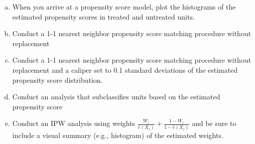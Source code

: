 \begin{enumerate}[(a)]
\item
  \begin{quoting}
    When you arrive at a propensity score model, plot the histograms
    of the estimated propensity scores in treated and untreated units.
  \end{quoting}

\item
  \begin{quoting}
    Conduct a 1-1 nearest neighbor propensity score matching procedure
    without replacement
  \end{quoting}

\item
  \begin{quoting}
    Conduct a 1-1 nearest neighbor propensity score matching procedure
    without replacement and a caliper set to 0.1 standard deviations
    of the estimated propensity score distribution.
  \end{quoting}

\item
  \begin{quoting}
    Conduct an analysis that subclassifies units based on the
    estimated propensity score
  \end{quoting}

\item
  \begin{quoting}
    Conduct an IPW analysis using weights
    $\frac{W_i}{\hat e(X_i)} + \frac{1 - W_i}{1 - \hat e(X_i)}$ and be
    sure to include a visual summary (e.g., histogram) of the
    estimated weights.
  \end{quoting}


\end{enumerate}
